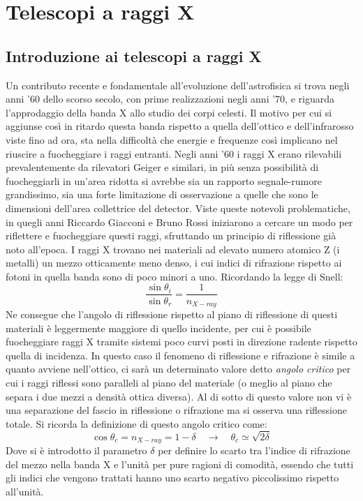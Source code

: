 \chapter{Telescopi a raggi X}

\section{Introduzione ai telescopi a raggi X}

Un contributo recente e fondamentale all'evoluzione dell'astrofisica si trova negli anni '60 dello scorso secolo, con prime realizzazioni negli anni '70, e riguarda l'approdaggio della banda X allo studio dei corpi celesti. Il motivo per cui si aggiunse così in ritardo questa banda rispetto a quella dell'ottico e dell'infrarosso viste fino ad ora, sta nella difficoltà che energie e frequenze così implicano nel riuscire a fuocheggiare i raggi entranti. Negli anni '60 i raggi X erano rilevabili prevalentemente da rilevatori Geiger e similari, in più senza possibilità di fuocheggiarli in un'area ridotta si avrebbe sia un rapporto segnale-rumore grandissimo, sia una forte limitazione di osservazione a quelle che sono le dimensioni dell'area collettrice del detector. Viste queste notevoli problematiche, in quegli anni Riccardo Giacconi e Bruno Rossi iniziarono a cercare un modo per riflettere e fuocheggiare questi raggi, sfruttando un principio di riflessione già noto all'epoca. I raggi X trovano nei materiali ad elevato numero atomico Z (i metalli) un mezzo otticamente meno denso, i cui indici di rifrazione rispetto ai fotoni in quella banda sono di poco minori a uno. Ricordando la legge di Snell:
\begin{equation}
    \frac{\sin\theta_i}{\sin\theta_r}=\frac{1}{n_{X-ray}}
\end{equation}
Ne consegue che l'angolo di riflessione rispetto al piano di riflessione di questi materiali è leggermente maggiore di quello incidente, per cui è possibile fuocheggiare raggi X tramite sistemi poco curvi posti in direzione radente rispetto quella di incidenza. In questo caso il fenomeno di riflessione e rifrazione è simile a quanto avviene nell'ottico, ci sarà un determinato valore detto \textit{angolo critico} per cui i raggi riflessi sono paralleli al piano del materiale (o meglio al piano che separa i due mezzi a densità ottica diversa). Al di sotto di questo valore non vi è una separazione del fascio in riflessione o rifrazione ma si osserva una riflessione totale. Si ricorda la definizione di questo angolo critico come:
\begin{equation*}
    \cos\theta_c = n_{X-ray} =
    1-\delta \quad \longrightarrow \quad
    \theta_c \simeq \sqrt{2\delta}
\end{equation*}
Dove si è introdotto il parametro $\delta$ per definire lo scarto tra l'indice di rifrazione del mezzo nella banda X e l'unità per pure ragioni di comodità, essendo che tutti gli indici che vengono trattati hanno uno scarto negativo piccolissimo rispetto all'unità.